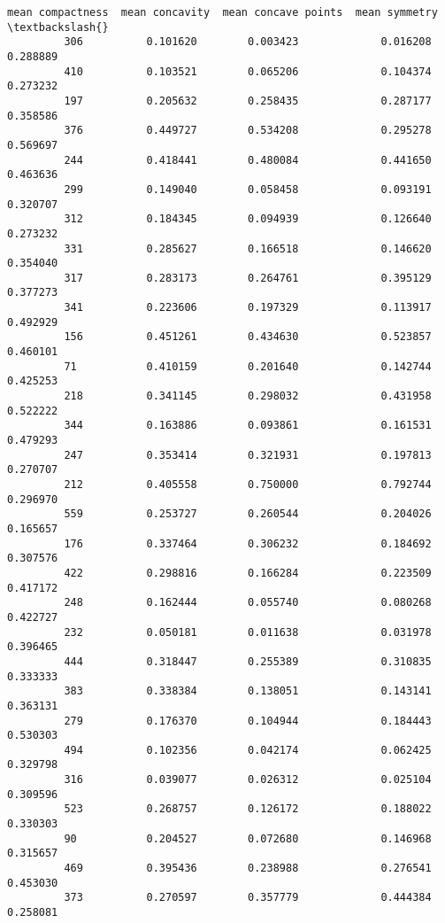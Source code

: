 \documentclass[11pt]{article}
\begin{document}
\begin{Verbatim}[commandchars=\\\{\}]
              mean compactness  mean concavity  mean concave points  mean symmetry  \textbackslash{}
         306          0.101620        0.003423             0.016208       0.288889   
         410          0.103521        0.065206             0.104374       0.273232   
         197          0.205632        0.258435             0.287177       0.358586   
         376          0.449727        0.534208             0.295278       0.569697   
         244          0.418441        0.480084             0.441650       0.463636   
         299          0.149040        0.058458             0.093191       0.320707   
         312          0.184345        0.094939             0.126640       0.273232   
         331          0.285627        0.166518             0.146620       0.354040   
         317          0.283173        0.264761             0.395129       0.377273   
         341          0.223606        0.197329             0.113917       0.492929   
         156          0.451261        0.434630             0.523857       0.460101   
         71           0.410159        0.201640             0.142744       0.425253   
         218          0.341145        0.298032             0.431958       0.522222   
         344          0.163886        0.093861             0.161531       0.479293   
         247          0.353414        0.321931             0.197813       0.270707   
         212          0.405558        0.750000             0.792744       0.296970   
         559          0.253727        0.260544             0.204026       0.165657   
         176          0.337464        0.306232             0.184692       0.307576   
         422          0.298816        0.166284             0.223509       0.417172   
         248          0.162444        0.055740             0.080268       0.422727   
         232          0.050181        0.011638             0.031978       0.396465   
         444          0.318447        0.255389             0.310835       0.333333   
         383          0.338384        0.138051             0.143141       0.363131   
         279          0.176370        0.104944             0.184443       0.530303   
         494          0.102356        0.042174             0.062425       0.329798   
         316          0.039077        0.026312             0.025104       0.309596   
         523          0.268757        0.126172             0.188022       0.330303   
         90           0.204527        0.072680             0.146968       0.315657   
         469          0.395436        0.238988             0.276541       0.453030   
         373          0.270597        0.357779             0.444384       0.258081   

\end{Verbatim}
\end{document}
